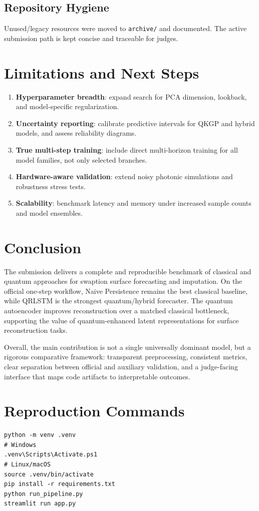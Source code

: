 \documentclass[11pt]{article}
\begin{document}
\subsection{Repository Hygiene}
Unused/legacy resources were moved to \texttt{archive/} and documented. The active submission path is kept concise and traceable for judges.

\section{Limitations and Next Steps}
\begin{enumerate}[leftmargin=1.4em]
  \item \textbf{Hyperparameter breadth}: expand search for PCA dimension, lookback, and model-specific regularization.
  \item \textbf{Uncertainty reporting}: calibrate predictive intervals for QKGP and hybrid models, and assess reliability diagrams.
  \item \textbf{True multi-step training}: include direct multi-horizon training for all model families, not only selected branches.
  \item \textbf{Hardware-aware validation}: extend noisy photonic simulations and robustness stress tests.
  \item \textbf{Scalability}: benchmark latency and memory under increased sample counts and model ensembles.
\end{enumerate}

\section{Conclusion}
The submission delivers a complete and reproducible benchmark of classical and quantum approaches for swaption surface forecasting and imputation. On the official one-step workflow, Naive Persistence remains the best classical baseline, while QRLSTM is the strongest quantum/hybrid forecaster. The quantum autoencoder improves reconstruction over a matched classical bottleneck, supporting the value of quantum-enhanced latent representations for surface reconstruction tasks.

Overall, the main contribution is not a single universally dominant model, but a rigorous comparative framework: transparent preprocessing, consistent metrics, clear separation between official and auxiliary validation, and a judge-facing interface that maps code artifacts to interpretable outcomes.

\appendix
\section{Reproduction Commands}
\begin{verbatim}
python -m venv .venv
# Windows
.venv\Scripts\Activate.ps1
# Linux/macOS
source .venv/bin/activate
pip install -r requirements.txt
python run_pipeline.py
streamlit run app.py
\end{verbatim}



\end{document}
